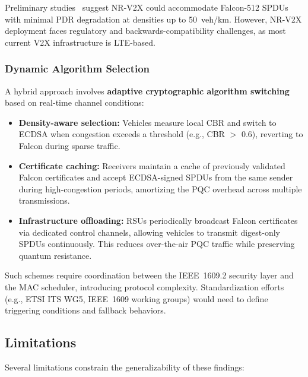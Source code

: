\documentclass[letterpaper,journal]{IEEEtran}
\begin{document}
Preliminary studies~\cite{bazzi2021sidelink} suggest NR-V2X could accommodate Falcon-512 SPDUs with minimal PDR degradation at densities up to 50~veh/km. However, NR-V2X deployment faces regulatory and backwards-compatibility challenges, as most current V2X infrastructure is LTE-based.

\subsubsection{Dynamic Algorithm Selection}

A hybrid approach involves \textbf{adaptive cryptographic algorithm switching} based on real-time channel conditions:
\begin{itemize}
    \item \textbf{Density-aware selection:} Vehicles measure local CBR and switch to ECDSA when congestion exceeds a threshold (e.g., CBR $>$ 0.6), reverting to Falcon during sparse traffic.
    \item \textbf{Certificate caching:} Receivers maintain a cache of previously validated Falcon certificates and accept ECDSA-signed SPDUs from the same sender during high-congestion periods, amortizing the PQC overhead across multiple transmissions.
    \item \textbf{Infrastructure offloading:} RSUs periodically broadcast Falcon certificates via dedicated control channels, allowing vehicles to transmit digest-only SPDUs continuously. This reduces over-the-air PQC traffic while preserving quantum resistance.
\end{itemize}

Such schemes require coordination between the IEEE~1609.2 security layer and the MAC scheduler, introducing protocol complexity. Standardization efforts (e.g., ETSI ITS WG5, IEEE~1609 working groups) would need to define triggering conditions and fallback behaviors.

\subsection{Limitations}

Several limitations constrain the generalizability of these findings:
\end{document}
